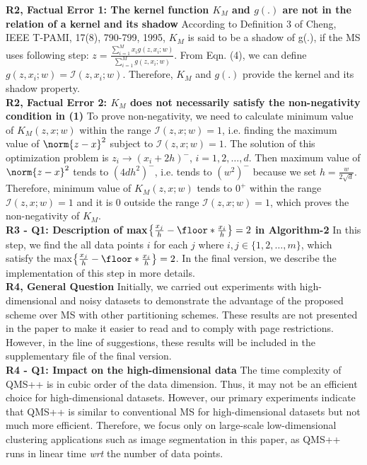 \documentclass{article}
\begin{document}
\textbf{R2, Factual Error 1: The kernel function $K_M$ and $g(.)$ are not in the relation of a kernel and its shadow} 
According to Definition 3 of Cheng, IEEE T-PAMI, 17(8), 790-799, 1995, $K_M$ is said to be a shadow of g(.), if the MS uses following step: $ z = \frac{\sum_{i=1}^M x_i g(z,x_i;w)}{\sum_{i=1}^M g(z,x_i;w)}$. From Eqn. (4), we can define $g(z,x_i;w) = \mathcal{I}(z,x_i;w)$. Therefore, $K_M$ and $g(.)$ provide the kernel and its shadow property.
\\
\textbf{R2, Factual Error 2: $K_M$ does not necessarily satisfy the non-negativity condition in (1)} 
To prove non-negativity, we need to calculate minimum value of $K_M(z,x;w)$ within the range $\mathcal{I}(z,x;w) = 1$, i.e. finding the maximum value of $\norm{z-x}^2$ subject to $\mathcal{I}(z,x;w) = 1$. The solution of this optimization problem is $z_i  \rightarrow (x_i+2h)^{-}$, $i = 1,2,\ldots, d$. Then maximum value of $\norm{z-x}^2$ tends to $(4dh^2)^{-}$, i.e. tends to $(w^2)^{-}$ because we set $h = \frac{w}{2\sqrt{d}}$. Therefore, minimum value of $K_M(z,x;w)$ tends to $0^{+}$ within the range $\mathcal{I}(z,x;w) = 1$ and it is $0$ outside the range $\mathcal{I}(z,x;w) = 1$, which proves the non-negativity of $K_M$.\\
\textbf{R3 - Q1: Description of max$\left\{\frac{x_j}{h}-\floor*{\frac{x_i}{h}}\right\} = 2$ in Algorithm-2} In this step, we find the all data points $i$ for each $j$ where $i,j \in \{1,2,\ldots,m\}$, which satisfy the max$\left\{\frac{x_j}{h}-\floor*{\frac{x_i}{h}}\right\} = 2$. In the final version, we describe the implementation of this step in more details.
\\
\textbf{R4, General Question} Initially, we carried out experiments with high-dimensional and noisy datasets to demonstrate the advantage of the proposed scheme over MS with other partitioning schemes. These results are not presented in the paper to make it easier to read and to comply with page restrictions. However, in the line of suggestions, these results will be included in the supplementary file of the final version.\\
\textbf{R4 - Q1: Impact on the high-dimensional data} The time complexity of QMS++ is in cubic order of the data dimension. Thus, it may not be an efficient choice for high-dimensional datasets. However, our primary experiments indicate that QMS++ is similar to conventional MS for high-dimensional datasets but not much more efficient. Therefore, we focus only on large-scale low-dimensional clustering applications such as image segmentation in this paper, as QMS++ runs in linear time \textit{wrt} the number of data points.\\
\end{document}
